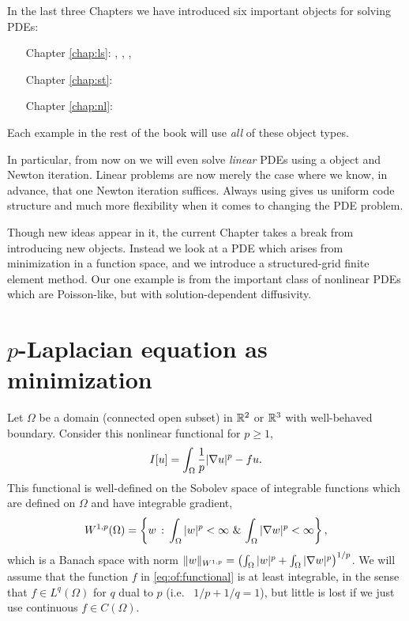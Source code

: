
In the last three Chapters we have introduced six important \PETSc objects for solving PDEs:
\begin{itemize}
\item[\quad Chapter \ref{chap:ls}:] \pVec, \pMat, \pKSP, \pPC
\item[\quad Chapter \ref{chap:st}:] \pDM{}
\item[\quad Chapter \ref{chap:nl}:] \pSNES
\end{itemize}
Each example in the rest of the book will use \emph{all} of these object types.

In particular, from now on we will even solve \emph{linear} PDEs using a \pSNES object and Newton iteration.  Linear problems are now merely the case where we know, in advance, that one Newton iteration suffices.  Always using \pSNES gives us uniform code structure and much more flexibility when it comes to changing the PDE problem.

Though new ideas appear in it, the current Chapter takes a break from introducing new \PETSc objects.  Instead we look at a PDE which arises from minimization in a function space, and we introduce a structured-grid finite element method.  Our one example is from the important class of nonlinear PDEs which are Poisson-like, but with solution-dependent diffusivity.


\section{$p$-Laplacian equation as minimization}

Let $\Omega$ be a domain (connected open subset) in $\mathbb{R}^2$ or $\mathbb{R}^3$ with well-behaved boundary.  Consider this nonlinear functional for $p \ge 1$,
\begin{equation}
    I[u] = \int_\Omega \frac{1}{p} |\nabla u|^p - fu.  \label{eq:of:functional}
\end{equation}
This functional is well-defined on the Sobolev space \citep{Evans2010} of integrable functions which are defined on $\Omega$ and have integrable gradient,
\begin{equation}
    W^{1,p}(\Omega) = \left\{w \,:\, \int_\Omega |w|^p < \infty \,\, \& \, \int_\Omega |\nabla w|^p < \infty\right\}, \label{eq:of:sobolevdefn}
\end{equation}
which is a Banach space with norm $\|w\|_{W^{1,p}} = \left(\int_\Omega |w|^p + \int_\Omega |\nabla w|^p\right)^{1/p}$.  We will assume that the function $f$ in \eqref{eq:of:functional} is at least integrable, in the sense that $f\in L^q(\Omega)$ for $q$ dual to $p$ (i.e.~ $1/p+1/q=1$), but little is lost if we just use continuous $f\in C(\Omega)$.

